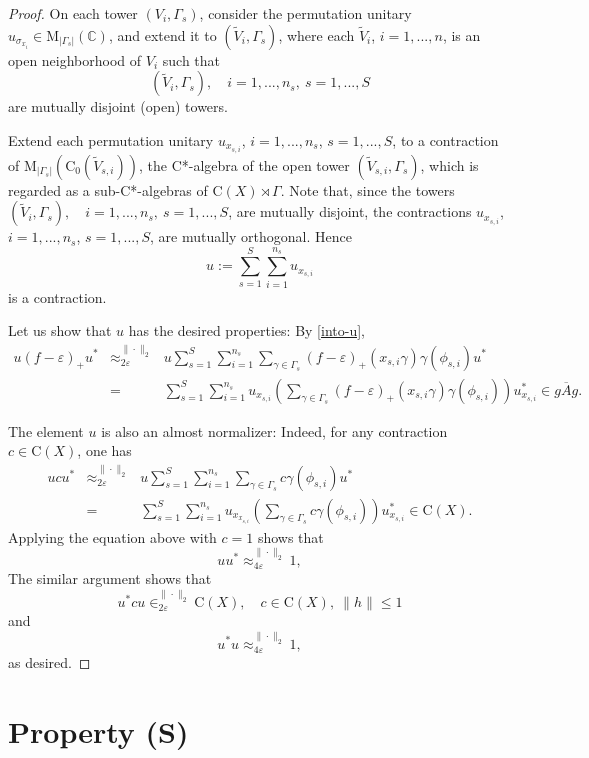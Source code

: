\documentclass[12pt, oneside, psamsfonts]{amsart}
\theoremstyle{definition}
\theoremstyle{remark}
\numberwithin{equation}{section}
\newcommand{\norm}[1]{\| #1\|}
\newcommand{\abs}[1]{| #1 |}
\newcommand{\Comp}{\mathbb C}
\newcommand{\eps}{\varepsilon}
\begin{document}
\begin{proof}
On each tower $(V_i, \Gamma_s)$, consider the permutation unitary $u_{\sigma_{x_i}} \in \mathrm{M}_{\abs{\Gamma_s}}(\Comp) $, and extend it to $(\tilde{V}_i, \Gamma_s)$, where each $\tilde{V}_i$, $i=1, ..., n$, is an open neighborhood of $V_i$ such that $$(\tilde{V}_i, \Gamma_s),\quad i=1, ..., n_s,\ s=1, ..., S$$ are mutually disjoint (open) towers.

Extend each permutation unitary $u_{x_{s, i}}$, $i=1, ..., n_s$, $s=1, ..., S$, to a contraction of $\mathrm{M}_{\abs{\Gamma_s}}(\mathrm{C}_0(\tilde{V}_{s, i}))$, the C*-algebra of the open tower $(\tilde{V}_{s, i}, \Gamma_s)$, which is regarded as a sub-C*-algebras of $\mathrm{C}(X) \rtimes \Gamma$. Note that, since the towers $(\tilde{V}_i, \Gamma_s),\quad i=1, ..., n_s,\ s=1, ..., S$, are mutually disjoint, the contractions $u_{x_{s, i}}$, $i=1, ..., n_s$, $s=1, ..., S$, are mutually orthogonal. Hence
$$u:= \sum_{s=1}^S\sum_{i=1}^{n_s} u_{x_{s, i}}$$
is a contraction.

Let us show that $u$ has the desired properties: By \eqref{into-u}, 
\begin{eqnarray*}
u(f - \eps)_+u^* & \approx_{2\eps}^{\norm{\cdot}_2} & u \sum_{s=1}^S\sum_{i=1}^{n_s}\sum_{\gamma \in \Gamma_s}(f - \eps)_+(x_{s, i} \gamma) \gamma(\phi_{s, i}) u^* \\
& = & \sum_{s=1}^S \sum_{i=1}^{n_s} u_{x_{s, i}}  (\sum_{\gamma \in \Gamma_s}(f - \eps)_+(x_{s, i} \gamma) \gamma(\phi_{s, i})) u^*_{x_{s, i}} \in \overline{gAg}.
\end{eqnarray*}

The element $u$ is also an almost normalizer: Indeed, for any contraction $c \in \mathrm{C}(X)$, one has
\begin{eqnarray*}
u c u^* & \approx_{2\eps}^{\norm{\cdot}_2} & u \sum_{s=1}^S\sum_{i=1}^{n_s} \sum_{\gamma \in \Gamma_s} c \gamma(\phi_{s, i}) u^* \\
& = & \sum_{s=1}^S \sum_{i=1}^{n_s} u_{x_{x_{s, i}}} ( \sum_{\gamma \in \Gamma_s}  c \gamma(\phi_{s, i})) u_{x_{s, i}}^* 
 \in  \mathrm{C}(X).
\end{eqnarray*}
Applying the equation above with $c = 1$ shows that
$$uu^* \approx_{4\eps}^{\norm{\cdot}_2} 1, $$
The similar argument shows that
$$u^*c u \in_{2\eps}^{\norm{\cdot}_2} \mathrm{C}(X), \quad c\in \mathrm{C}(X),\ \norm{h}\leq 1$$
and
$$u^*u \approx_{4\eps}^{\norm{\cdot}_2} 1,$$
as desired.
\end{proof}


\section{Property (S)}
\end{document}
